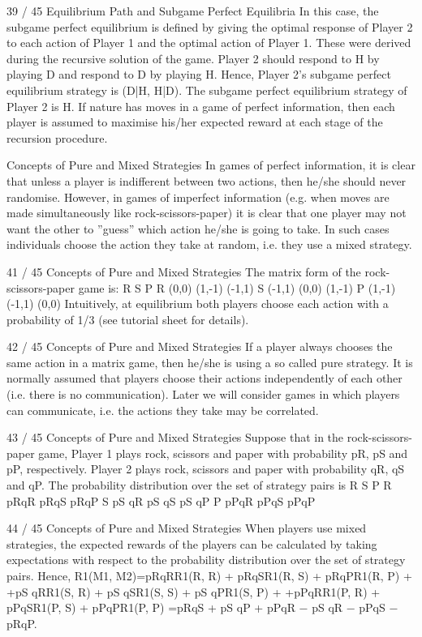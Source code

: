 39 / 45
Equilibrium Path and Subgame Perfect Equilibria
In this case, the subgame perfect equilibrium is defined by giving
the optimal response of Player 2 to each action of Player 1 and the
optimal action of Player 1.
These were derived during the recursive solution of the game.
Player 2 should respond to H by playing D and respond to D by
playing H. Hence, Player 2’s subgame perfect equilibrium strategy
is (D|H, H|D).
The subgame perfect equilibrium strategy of Player 2 is H.
If nature has moves in a game of perfect information, then each
player is assumed to maximise his/her expected reward at each
stage of the recursion procedure.

Concepts of Pure and Mixed Strategies
In games of perfect information, it is clear that unless a player is
indifferent between two actions, then he/she should never
randomise.
However, in games of imperfect information (e.g. when moves are
made simultaneously like rock-scissors-paper) it is clear that one
player may not want the other to ”guess” which action he/she is
going to take.
In such cases individuals choose the action they take at random,
i.e. they use a mixed strategy.

41 / 45
Concepts of Pure and Mixed Strategies
The matrix form of the rock-scissors-paper game is:
R S P
R (0,0) (1,-1) (-1,1)
S (-1,1) (0,0) (1,-1)
P (1,-1) (-1,1) (0,0)
Intuitively, at equilibrium both players choose each action with a
probability of 1/3 (see tutorial sheet for details).

42 / 45
Concepts of Pure and Mixed Strategies
If a player always chooses the same action in a matrix game, then
he/she is using a so called pure strategy.
It is normally assumed that players choose their actions
independently of each other (i.e. there is no communication).
Later we will consider games in which players can communicate,
i.e. the actions they take may be correlated.

43 / 45
Concepts of Pure and Mixed Strategies
Suppose that in the rock-scissors-paper game, Player 1 plays rock,
scissors and paper with probability pR, pS and pP, respectively.
Player 2 plays rock, scissors and paper with probability qR, qS and
qP. The probability distribution over the set of strategy pairs is
R S P
R pRqR pRqS pRqP
S pS qR pS qS pS qP
P pPqR pPqS pPqP

44 / 45
Concepts of Pure and Mixed Strategies
When players use mixed strategies, the expected rewards of the
players can be calculated by taking expectations with respect to
the probability distribution over the set of strategy pairs. Hence,
R1(M1, M2)=pRqRR1(R, R) + pRqSR1(R, S) + pRqPR1(R, P) +
+pS qRR1(S, R) + pS qSR1(S, S) + pS qPR1(S, P) +
+pPqRR1(P, R) + pPqSR1(P, S) + pPqPR1(P, P)
=pRqS + pS qP + pPqR − pS qR − pPqS − pRqP.
